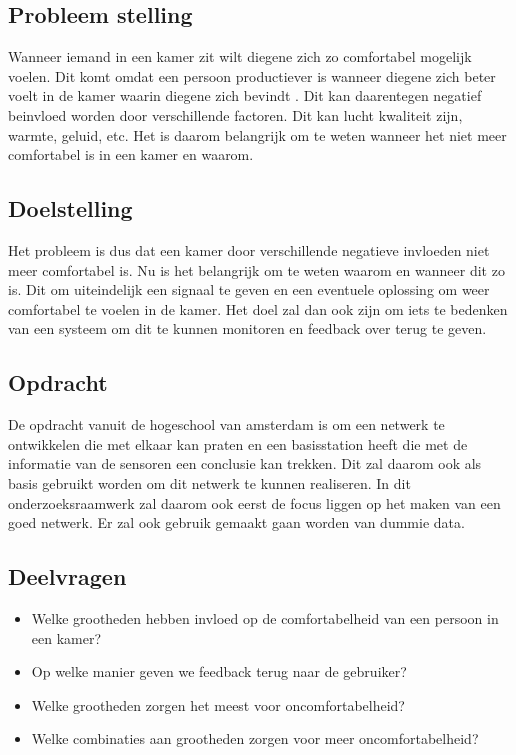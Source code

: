 \subsection{Probleem stelling}
    Wanneer iemand in een kamer zit wilt diegene zich zo comfortabel mogelijk voelen. Dit komt omdat een persoon productiever is wanneer  
    diegene zich beter voelt in de kamer waarin diegene zich bevindt \cite{productiviteit}. Dit kan daarentegen negatief beinvloed worden door verschillende 
    factoren. Dit kan lucht kwaliteit zijn, warmte, geluid, etc. Het is daarom belangrijk om te weten wanneer het niet
    meer comfortabel is in een kamer en waarom.

\subsection{Doelstelling}
    Het probleem is dus dat een kamer door verschillende negatieve invloeden niet meer comfortabel is. Nu is het belangrijk om te weten waarom
    en wanneer dit zo is. Dit om uiteindelijk een signaal te geven en een eventuele oplossing om weer comfortabel te voelen in de kamer.
    Het doel zal dan ook zijn om iets te bedenken van een systeem om dit te kunnen monitoren en feedback over terug te geven.

\subsection{Opdracht}
De opdracht vanuit de hogeschool van amsterdam is om een netwerk te ontwikkelen die met elkaar kan praten en een basisstation heeft die met de 
informatie van de sensoren een conclusie kan trekken. Dit zal daarom ook als basis gebruikt worden om dit netwerk te kunnen realiseren. In dit 
onderzoeksraamwerk zal daarom ook eerst de focus liggen op het maken van een goed netwerk. Er zal ook gebruik gemaakt gaan worden van dummie data.

\subsection{Deelvragen}
\begin{itemize}
    \item Welke grootheden hebben invloed op de comfortabelheid van een persoon in een kamer?
    \item Op welke manier geven we feedback terug naar de gebruiker?
    \item Welke grootheden zorgen het meest voor oncomfortabelheid?
    \item Welke combinaties aan grootheden zorgen voor meer oncomfortabelheid?
\end{itemize}
